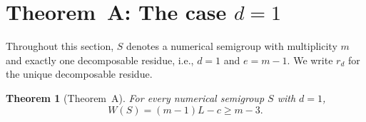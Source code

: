 \documentclass[11pt]{amsart}
\newtheorem{theorem}{Theorem}[section]
\theoremstyle{definition}
\theoremstyle{remark}
\begin{document}
\section{Theorem~A: The case \texorpdfstring{$d = 1$}{d = 1}}\label{sec:thmA}

Throughout this section, $S$ denotes a numerical semigroup with multiplicity $m$
and exactly one decomposable residue, i.e., $d = 1$ and $e = m - 1$.
We write $r_d$ for the unique decomposable residue.

\begin{theorem}[Theorem~A]\label{thm:A}
For every numerical semigroup $S$ with $d = 1$,
\[
  W(S) = (m - 1) L - c \ge m - 3.
\]
\end{theorem}
\end{document}
